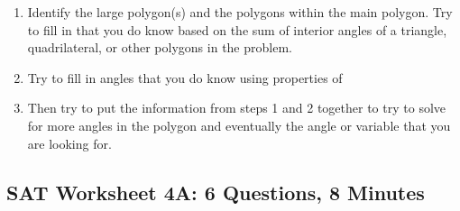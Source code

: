 \documentclass[12pt]{book}
\newcommand{\longline}{\underline{\hspace{2in}} }
\begin{document}
\bigskip
\begin{enumerate}[label=\arabic*)]
\item Identify the large polygon(s) and the polygons within the main polygon. Try to fill in \longline that you do know based on the sum of interior angles of a triangle, quadrilateral, or other polygons in the problem.

\bigskip\item Try to fill in angles that you do know using properties of \longline

\bigskip\item Then try to put the information from steps 1 and 2 together to try to solve for more angles in the polygon and eventually the angle or variable that you are looking for. 
\end{enumerate}

\newpage
\subsection{SAT Worksheet 4A: 6 Questions, 8 Minutes}
\end{document}
